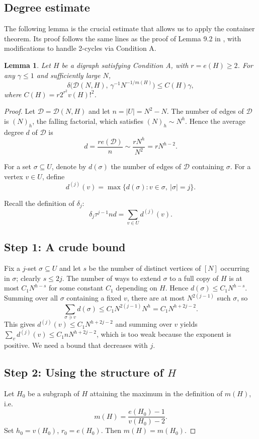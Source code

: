 \documentclass[11pt,a4paper]{article}
\newtheorem{lemma}[theorem]{Lemma}
\newcommand{\cD}{\mathcal{D}}
\begin{document}
\subsection{Degree estimate}
The following lemma is the crucial estimate that allows us to apply the container theorem. Its proof follows the same lines as the proof of Lemma 9.2 in \cite{SAX2015}, with modifications to handle 2-cycles via Condition A.

\begin{lemma}\label{lem:degree}
Let $H$ be a digraph satisfying Condition A, with $r=e(H)\ge2$. For any $\gamma\le1$ and sufficiently large $N$,
\[
\delta\bigl(\cD(N,H),\,\gamma^{-1}N^{-1/m(H)}\bigr)\le C(H)\gamma,
\]
where $C(H)=r2^{r^2}v(H)!^2$.
\end{lemma}

\begin{proof}
Let $\cD=\cD(N,H)$ and let $n=|U|=N^2-N$. The number of edges of $\cD$ is $(N)_h$, the falling factorial, which satisfies $(N)_h\sim N^h$. Hence the average degree $d$ of $\cD$ is
\[
d = \frac{r e(\cD)}{n} \sim \frac{r N^h}{N^2}=rN^{h-2}.
\]

For a set $\sigma\subseteq U$, denote by $d(\sigma)$ the number of edges of $\cD$ containing $\sigma$. For a vertex $v\in U$, define
\[
d^{(j)}(v)=\max\{d(\sigma):v\in\sigma,\ |\sigma|=j\}.
\]

Recall the definition of $\delta_j$:
\[
\delta_j\tau^{j-1}nd = \sum_{v\in U} d^{(j)}(v).
\]

\subsection*{Step 1: A crude bound}
Fix a $j$-set $\sigma\subseteq U$ and let $s$ be the number of distinct vertices of $[N]$ occurring in $\sigma$; clearly $s\le 2j$. The number of ways to extend $\sigma$ to a full copy of $H$ is at most $C_1 N^{h-s}$ for some constant $C_1$ depending on $H$. Hence $d(\sigma)\le C_1 N^{h-s}$. Summing over all $\sigma$ containing a fixed $v$, there are at most $N^{2(j-1)}$ such $\sigma$, so
\[
\sum_{\sigma\ni v} d(\sigma) \le C_1 N^{2(j-1)} N^{h} = C_1 N^{h+2j-2}.
\]
This gives $d^{(j)}(v)\le C_1 N^{h+2j-2}$ and summing over $v$ yields $\sum_v d^{(j)}(v)\le C_1 n N^{h+2j-2}$, which is too weak because the exponent is positive. We need a bound that decreases with $j$.

\subsection*{Step 2: Using the structure of $H$}
Let $H_0$ be a subgraph of $H$ attaining the maximum in the definition of $m(H)$, i.e.
\[
m(H)=\frac{e(H_0)-1}{v(H_0)-2}.
\]
Set $h_0=v(H_0)$, $r_0=e(H_0)$. Then $m(H)=m(H_0)$.


\end{proof}
\end{document}
